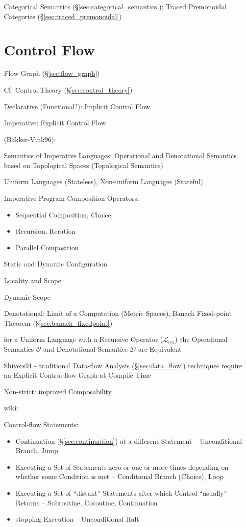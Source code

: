Categorical Semantics (\S\ref{sec:categorical_semantics}): Traced
Premonoidal Categories (\S\ref{sec:traced_premonoidal})



\section{Control Flow}\label{sec:control_flow}

\fist Flow Graph (\S\ref{sec:flow_graph})

\fist Cf. Control Theory (\S\ref{sec:control_theory})

Declarative (Functional?): Implicit Control Flow

Imperative: Explicit Control Flow

(Bakker-Vink96):

Semantics of Imperative Languages: Operational and Denotational
Semantics based on Topological Spaces (Topological Semantics)

Uniform Languages (Stateless), Non-uniform Languages (Stateful)

Imperative Program Composition Operators:
\begin{itemize}
  \item Sequential Composition, Choice
  \item Recursion, Iteration
  \item Parallel Composition
\end{itemize}

Static and Dynamic Configuration

Locality and Scope

Dynamic Scope

Denotational: Limit of a Computation (Metric Spaces), Banach
Fixed-point Theorem (\S\ref{sec:banach_fixedpoint}) %

for a Uniform Language with a Recursive Operator ($\mathcal{L}_{rec}$)
the Operational Semantics $\mathcal{O}$ and Denotational Semantics
$\mathcal{D}$ are Equivalent


\asterism


Shivers91 - traditional Data-flow Analysis (\S\ref{sec:data_flow})
techniques require an Explicit Control-flow Graph at Compile Time

Non-strict: improved Composability %


wiki:

Control-flow Statements:
\begin{itemize}
  \item Continuation (\S\ref{sec:continuation}) at a different
    Statement -- Unconditional Branch, Jump
  \item Executing a Set of Statements zero or one or more times
    depending on whether some Condition is met -- Conditional Branch
    (Choice), Loop
  \item Executing a Set of ``distant'' Statements after which Control
    ``usually'' Returns -- Subroutine, Coroutine, Continuation
  \item stopping Execution -- Unconditional Halt
\end{itemize}

